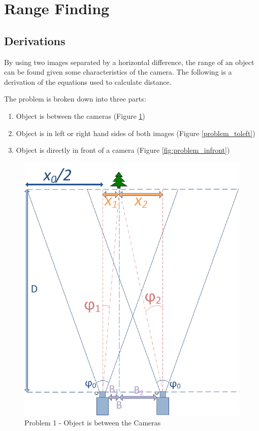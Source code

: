 \section{Range Finding}

\subsection{Derivations}

By using two images separated by a horizontal difference, the range of an object can be found given some characteristics of the camera. The following is a derivation of the equations used to calculate distance. 

The problem is broken down into three parts:
\begin{enumerate}
\item Object is between the cameras (Figure \ref{problem_between})
\item Object is in left or right hand sides of both images (Figure \ref{problem_toleft})
\item Object is directly in front of a camera (Figure \ref{fig:problem_infront})
\end{enumerate}

\begin{figure}
\includegraphics[width=\textwidth,height=\textheight,keepaspectratio]{Figures/problem1.png}
\caption{Problem 1 - Object is between the Cameras}
\label{problem_between}
\end{figure}


